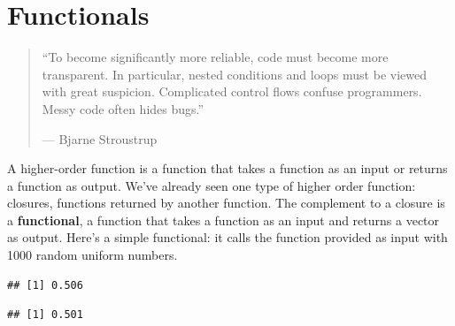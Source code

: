 \hypertarget{functionals}{%
\chapter{Functionals}\label{functionals}}

\begin{quote}
``To become significantly more reliable, code must become more
transparent. In particular, nested conditions and loops must be viewed
with great suspicion. Complicated control flows confuse programmers.
Messy code often hides bugs.''

--- Bjarne Stroustrup
\end{quote}

A higher-order function is a function that takes a function as an input
or returns a function as output. We've already seen one type of higher
order function: closures, functions returned by another function. The
complement to a closure is a \textbf{functional}, a function that takes
a function as an input and returns a vector as output. Here's a simple
functional: it calls the function provided as input with 1000 random
uniform numbers. 

\begin{Shaded}
\begin{Highlighting}[]
\StringTok{ }\NormalTok{(}\NormalTok{(}\NormalTok{))}
\end{Highlighting}
\end{Shaded}

\begin{verbatim}
## [1] 0.506
\end{verbatim}

\begin{Shaded}
\begin{Highlighting}[]
\end{Highlighting}
\end{Shaded}

\begin{verbatim}
## [1] 0.501
\end{verbatim}

\begin{Shaded}
\begin{Highlighting}[]
\end{Highlighting}
\end{Shaded}

